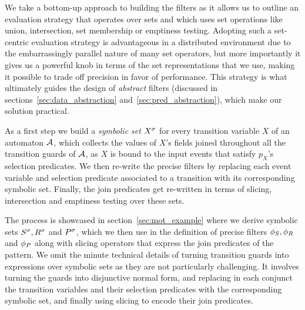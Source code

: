 We take a bottom-up approach to building the filters as it allows us 
to outline an evaluation strategy that operates over sets and which uses set 
operations like union, intersection, set membership or emptiness testing. 
Adopting such a set-centric evaluation strategy is advantageous in a 
distributed environment due to the embarrassingly parallel nature of many set 
operators, but more importantly it gives us a powerful knob in terms of the set 
representations that we use, making it possible to trade off precision in favor 
of performance. 
This strategy is what ultimately guides the design of {\em abstract} 
filters (discussed in sections~\ref{sec:data_abstraction} 
and~\ref{sec:pred_abstraction}), which make our solution practical.
   

As a first step we build a {\em symbolic set} ${X}^{\sigma}$ for every transition 
variable $X$ of an automaton $\mathcal{A}$, 
which collects the values of $X$'s fields joined throughout all the transition 
guards of $\mathcal{A}$, as $X$ is bound to the input events that satisfy $p_X$'s
selection predicates.
We then re-write the precise filters by replacing each event variable and 
selection predicate associated to a transition with its corresponding symbolic 
set.
Finally, the join predicates get re-written in terms of slicing, intersection 
and emptiness testing over these sets.

The process is showcased in section~\ref{sec:mot_example} where we derive 
symbolic sets ${S}^{\sigma}, {R}^{\sigma}$ and ${P}^{\sigma}$, which we then use in the 
definition of precise filters $\phi_{S}, \phi_{R}$ and $\phi_{P}$ along with 
slicing operators that express the join predicates of the pattern.
We omit the minute technical details of turning transition guards into 
expressions over symbolic sets as they are not particularly challenging.
It involves turning the guards into disjunctive normal form, and replacing in 
each conjunct the transition variables and their selection predicates with the 
corresponding symbolic set, and finally using slicing to encode their join 
predicates.    

